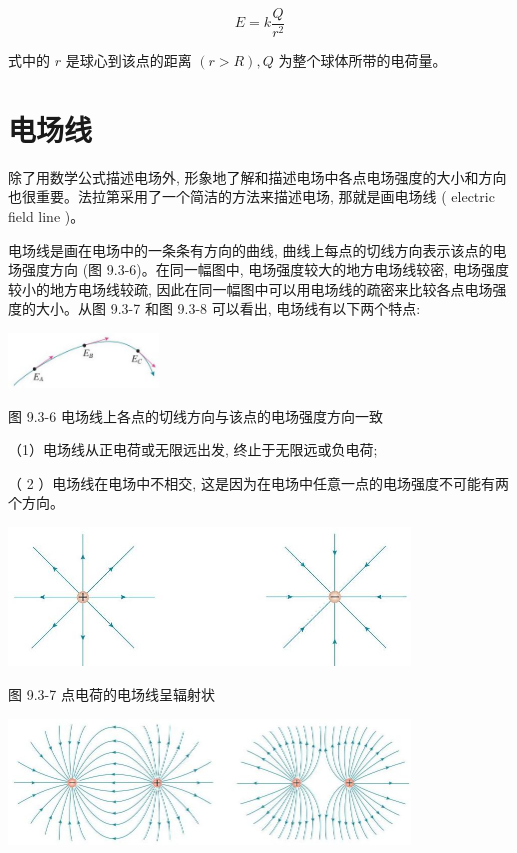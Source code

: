 \documentclass[10pt]{article}
\begin{document}
\[
E = k\frac{Q}{{r}^{2}}
\]

式中的 \(r\) 是球心到该点的距离 \(\left( {r > R}\right) ,Q\) 为整个球体所带的电荷量。

\section*{电场线}

除了用数学公式描述电场外, 形象地了解和描述电场中各点电场强度的大小和方向也很重要。法拉第采用了一个简洁的方法来描述电场, 那就是画电场线 ( electric field line )。

电场线是画在电场中的一条条有方向的曲线, 曲线上每点的切线方向表示该点的电场强度方向 (图 9.3-6)。在同一幅图中, 电场强度较大的地方电场线较密, 电场强度较小的地方电场线较疏, 因此在同一幅图中可以用电场线的疏密来比较各点电场强度的大小。从图 9.3-7 和图 9.3-8 可以看出, 电场线有以下两个特点:

\begin{center}
\includegraphics[max width=0.3\textwidth]{images/01911d5f-8e38-70c0-b5b8-2b399bd115b6_20_867286.jpg}
\end{center}

图 9.3-6 电场线上各点的切线方向与该点的电场强度方向一致

（1）电场线从正电荷或无限远出发, 终止于无限远或负电荷;

（ 2 ）电场线在电场中不相交, 这是因为在电场中任意一点的电场强度不可能有两个方向。

\begin{center}
\includegraphics[max width=0.8\textwidth]{images/01911d5f-8e38-70c0-b5b8-2b399bd115b6_20_781112.jpg}
\end{center}

图 9.3-7 点电荷的电场线呈辐射状

\begin{center}
\includegraphics[max width=0.8\textwidth]{images/01911d5f-8e38-70c0-b5b8-2b399bd115b6_20_943818.jpg}
\end{center}
\end{document}
